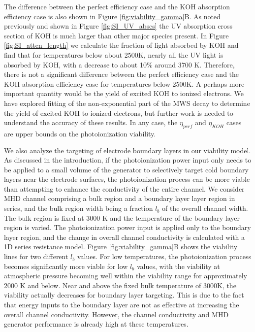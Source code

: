 The difference between the perfect efficiency case and the KOH absorption efficiency case is also shown in Figure \ref{fig:viability_gamma}B. As noted previously and shown in Figure \ref{fig:SI_UV_abscs} the UV absorption cross section of KOH is much larger than other major species present. In Figure \ref*{fig:SI_atten_length} we calculate the fraction of light absorbed by KOH and find that for temperatures below about 2500K, nearly all the UV light is absorbed by KOH, with a decrease to about 10\% around 3700 K. Therefore, there is not a significant difference between the perfect efficiency case and the KOH absorption efficiency case for temperatures below 2500K. A perhaps more important quantity would be the yield of excited KOH to ionized electrons. We have explored fitting of the non-exponential part of the MWS decay to determine the yield of excited KOH to ionized electrons, but further work is needed to understand the accuracy of these results. In any case, the $\eta_{perf}$ and $\eta_{KOH}$ cases are upper bounds on the photoionization viability.  

We also analyze the targeting of electrode boundary layers in our viability model. As discussed in the introduction, if the photoionization power input only needs to be applied to a small volume of the generator to selectively target cold boundary layers near the electrode surfaces, the photoionization process can be more viable than attempting to enhance the conductivity of the entire channel. We consider MHD channel comprising a bulk region and a boundary layer layer region in series, and the bulk region width being a fraction $l_b$ of the overall channel width. The bulk region is fixed at 3000 K and the temperature of the boundary layer region is varied. The photoionization power input is applied only to the boundary layer region, and the change in overall channel conductivity is calculated with a 1D series resistance model. Figure \ref{fig:viability_gamma}B shows the viability lines for two different $l_b$ values. For low temperatures, the photoionization process becomes significantly more viable for low $l_b$ values, with the viability at atmospheric pressure becoming well within the viability range for approximately 2000 K and below. Near and above the fixed bulk temperature of 3000K, the viability actually decreases for boundary layer targeting. This is due to the fact that energy inputs to the boundary layer are not as effective at increasing the overall channel conductivity. However, the channel conductivity and MHD generator performance is already high at these temperatures. 


